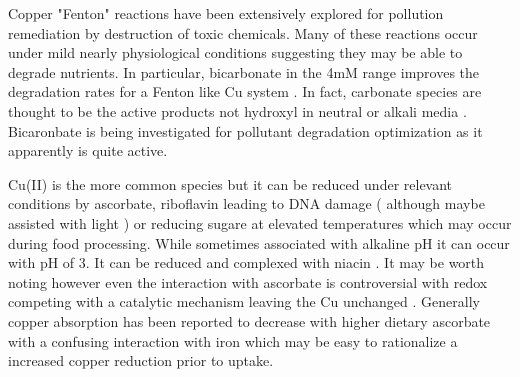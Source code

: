  Copper "Fenton" reactions have been extensively explored
for pollution remediation by destruction of toxic
chemicals. Many of these reactions occur under mild
nearly physiological conditions suggesting they may
be able to degrade nutrients. 
In particular, bicarbonate in the 4mM range improves
the degradation rates for a Fenton like Cu system 
\cite{Peng_Zhang_Zhang_Enhanced_mediated_2019}.
In fact, carbonate species 
are thought to be the active products not hydroxyl
in neutral or alkali media 
\cite{PMID30458276}. Bicaronbate is being investigated
for pollutant degradation optimization \cite{PMID39708608}
as it apparently is quite active. 



Cu(II) is the more common species but it can be reduced
under relevant conditions by ascorbate, riboflavin leading to
DNA damage \cite{PMID8349205}( although maybe assisted with
light \cite{PMID8791088} )  or reducing sugare
at elevated temperatures which may occur during food processing.
While sometimes associated with alkaline pH it can occur
with pH of 3\cite{HernandezLopez_SanchezFelix_Sierra_Quantification_Reducing_Sugars_2020}.
It can be reduced and complexed with niacin
\cite{charvv324ska_charvv322y_Interaction_niacin_with_2013}.
It may be worth noting however even the interaction with ascorbate
is controversial with redox competing with a catalytic
mechanism leaving the Cu unchanged
\cite{Shen_Griffiths_Campbell_Ascorbate_oxidation_iron_2021}.
Generally copper absorption has been reported to decrease with
higher dietary ascorbate with a confusing interaction with iron
\cite{Johnson1988} which may be easy to rationalize a increased
copper reduction prior to uptake. 


